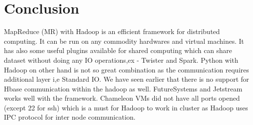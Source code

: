 \documentclass[9pt,twocolumn,twoside]{../../styles/osajnl}
\begin{document}
\section{Conclusion}
MapReduce (MR) with Hadoop is an efficient framework for distributed computing. It can be run on any commodity hardwares and virtual machines. It has also some useful plugins available for shared computing which can share dataset without doing any IO operations,ex - Twister and Spark. Python with Hadoop on other hand is not so great combination as the communication requires additional layer i,e Standard IO. We have seen earlier that there is no support for Hbase communication within the hadoop as well. FutureSystems and Jetstream works well with the framework. Chameleon VMs did not have all ports opened (except 22 for ssh) which is a must for Hadoop to work in cluster as Hadoop uses IPC protocol for inter node communication. 




 
\end{document}
